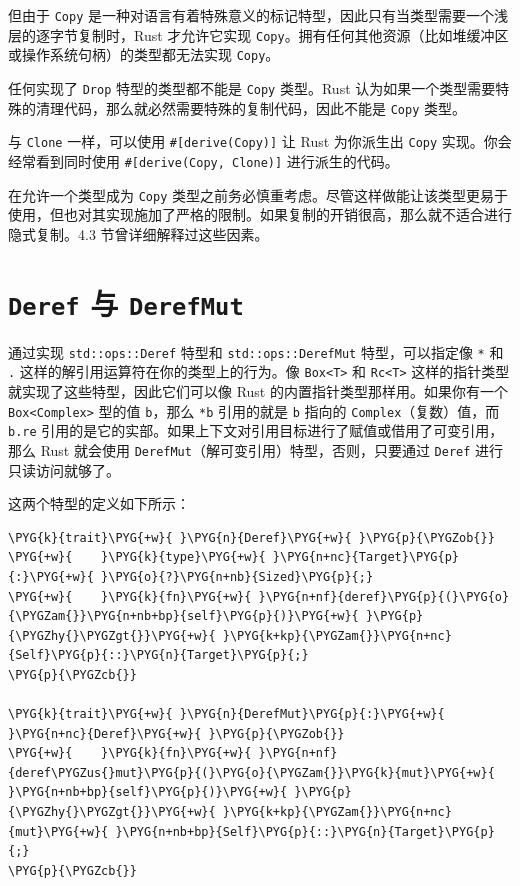 但由于 \texttt{Copy} 是一种对语言有着特殊意义的标记特型，因此只有当类型需要一个浅层的逐字节复制时，Rust 才允许它实现 \texttt{Copy}。拥有任何其他资源（比如堆缓冲区或操作系统句柄）的类型都无法实现 \texttt{Copy}。

任何实现了 \texttt{Drop} 特型的类型都不能是 \texttt{Copy} 类型。Rust 认为如果一个类型需要特殊的清理代码，那么就必然需要特殊的复制代码，因此不能是 \texttt{Copy} 类型。

与 \texttt{Clone} 一样，可以使用 \texttt{\#[derive(Copy)]} 让 Rust 为你派生出 \texttt{Copy} 实现。你会经常看到同时使用 \texttt{\#[derive(Copy, Clone)]} 进行派生的代码。

在允许一个类型成为 \texttt{Copy} 类型之前务必慎重考虑。尽管这样做能让该类型更易于使用，但也对其实现施加了严格的限制。如果复制的开销很高，那么就不适合进行隐式复制。4.3 节曾详细解释过这些因素。

\section{\texttt{Deref} 与 \texttt{DerefMut}}

通过实现 \texttt{std::ops::Deref} 特型和 \texttt{std::ops::DerefMut} 特型，可以指定像 \texttt{*} 和 \texttt{.} 这样的解引用运算符在你的类型上的行为。像 \texttt{Box<T>} 和 \texttt{Rc<T>} 这样的指针类型就实现了这些特型，因此它们可以像 Rust 的内置指针类型那样用。如果你有一个 \texttt{Box<Complex>} 型的值 \texttt{b}，那么 \texttt{*b} 引用的就是 \texttt{b} 指向的 \texttt{Complex}（复数）值，而 \texttt{b.re} 引用的是它的实部。如果上下文对引用目标进行了赋值或借用了可变引用，那么 Rust 就会使用 \texttt{DerefMut}（解可变引用）特型，否则，只要通过 \texttt{Deref} 进行只读访问就够了。

这两个特型的定义如下所示：

\begin{Verbatim}[commandchars=\\\{\},breaklines=true,breakanywhere=true,fontsize=\codefont,xleftmargin=17bp]
\PYG{k}{trait}\PYG{+w}{ }\PYG{n}{Deref}\PYG{+w}{ }\PYG{p}{\PYGZob{}}
\PYG{+w}{    }\PYG{k}{type}\PYG{+w}{ }\PYG{n+nc}{Target}\PYG{p}{:}\PYG{+w}{ }\PYG{o}{?}\PYG{n+nb}{Sized}\PYG{p}{;}
\PYG{+w}{    }\PYG{k}{fn}\PYG{+w}{ }\PYG{n+nf}{deref}\PYG{p}{(}\PYG{o}{\PYGZam{}}\PYG{n+nb+bp}{self}\PYG{p}{)}\PYG{+w}{ }\PYG{p}{\PYGZhy{}\PYGZgt{}}\PYG{+w}{ }\PYG{k+kp}{\PYGZam{}}\PYG{n+nc}{Self}\PYG{p}{::}\PYG{n}{Target}\PYG{p}{;}
\PYG{p}{\PYGZcb{}}

\PYG{k}{trait}\PYG{+w}{ }\PYG{n}{DerefMut}\PYG{p}{:}\PYG{+w}{ }\PYG{n+nc}{Deref}\PYG{+w}{ }\PYG{p}{\PYGZob{}}
\PYG{+w}{    }\PYG{k}{fn}\PYG{+w}{ }\PYG{n+nf}{deref\PYGZus{}mut}\PYG{p}{(}\PYG{o}{\PYGZam{}}\PYG{k}{mut}\PYG{+w}{ }\PYG{n+nb+bp}{self}\PYG{p}{)}\PYG{+w}{ }\PYG{p}{\PYGZhy{}\PYGZgt{}}\PYG{+w}{ }\PYG{k+kp}{\PYGZam{}}\PYG{n+nc}{mut}\PYG{+w}{ }\PYG{n+nb+bp}{Self}\PYG{p}{::}\PYG{n}{Target}\PYG{p}{;}
\PYG{p}{\PYGZcb{}}
\end{Verbatim}

